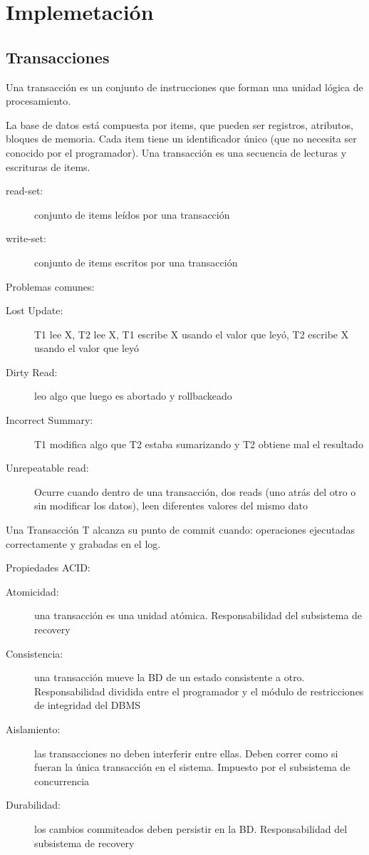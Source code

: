 \chapter{Implemetación}

\section{Transacciones}

Una transacción es un conjunto de instrucciones que forman una unidad lógica de procesamiento.

La base de datos está compuesta por items, que pueden ser registros, atributos, bloques de memoria.
Cada item tiene un identificador único (que no necesita ser conocido por el programador).
Una transacción es una secuencia de lecturas y escrituras de items.

\begin{description}
	\item[read-set:] conjunto de items leídos por una transacción
	\item[write-set:] conjunto de items escritos por una transacción
\end{description}

Problemas comunes:

\begin{description}
	\item[Lost Update:] T1 lee X, T2 lee X, T1 escribe X usando el valor que leyó, T2 escribe X usando el valor que leyó
	\item[Dirty Read:] leo algo que luego es abortado y rollbackeado
	\item[Incorrect Summary:] T1 modifica algo que T2 estaba sumarizando y T2 obtiene mal el resultado
	\item[Unrepeatable read:] Ocurre cuando dentro de una transacción, dos reads (uno atrás del otro o sin modificar los datos), leen diferentes valores del mismo dato
\end{description}

Una Transacción T alcanza su punto de commit cuando: operaciones ejecutadas correctamente y grabadas en el log.

Propiedades ACID:

\begin{description}
	\item[Atomicidad:] una transacción es una unidad atómica. Responsabilidad del subsistema de recovery
	\item[Consistencia:] una transacción mueve la BD de un estado consistente a otro. Responsabilidad dividida entre el programador y el módulo de restricciones de integridad del DBMS
	\item[Aislamiento:] las transacciones no deben interferir entre ellas. Deben correr como si fueran la única transacción en el sistema. Impuesto por el subsistema de concurrencia
	\item[Durabilidad:] los cambios commiteados deben persistir en la BD. Responsabilidad del subsistema de recovery
\end{description}

